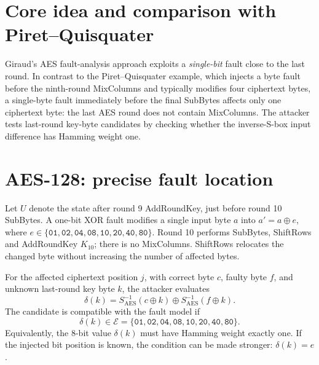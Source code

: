 \documentclass[11pt,a4paper]{report}
\newcommand{\hex}[1]{\texttt{#1}}
\newcommand{\xor}{\mathbin{\oplus}}
\begin{document}
\section{Core idea and comparison with Piret--Quisquater}
Giraud's AES fault-analysis approach exploits a \emph{single-bit} fault close to the last round. In contrast to the Piret--Quisquater example, which injects a byte fault before the ninth-round MixColumns and typically modifies four ciphertext bytes, a single-byte fault immediately before the final SubBytes affects only one ciphertext byte: the last AES round does not contain MixColumns. The attacker tests last-round key-byte candidates by checking whether the inverse-S-box input difference has Hamming weight one.

\section{AES-128: precise fault location}
Let $U$ denote the state after round 9 AddRoundKey, just before round 10 SubBytes. A one-bit XOR fault modifies a single input byte $a$ into $a'=a\xor e$, where $e\in\{\hex{01},\hex{02},\hex{04},\hex{08},\hex{10},\hex{20},\hex{40},\hex{80}\}$. Round 10 performs SubBytes, ShiftRows and AddRoundKey $K_{10}$; there is no MixColumns. ShiftRows relocates the changed byte without increasing the number of affected bytes.

For the affected ciphertext position $j$, with correct byte $c$, faulty byte $f$, and unknown last-round key byte $k$, the attacker evaluates
\begin{equation}
\delta(k)=S_{\mathrm{AES}}^{-1}(c\xor k)\xor S_{\mathrm{AES}}^{-1}(f\xor k).
\label{eq:giraud_aes_test}
\end{equation}
The candidate is compatible with the fault model if
\begin{equation}
\delta(k)\in\mathcal E=\{\hex{01},\hex{02},\hex{04},\hex{08},\hex{10},\hex{20},\hex{40},\hex{80}\}.
\end{equation}
Equivalently, the 8-bit value $\delta(k)$ must have Hamming weight exactly one. If the injected bit position is known, the condition can be made stronger: $\delta(k)=e$.
\end{document}
